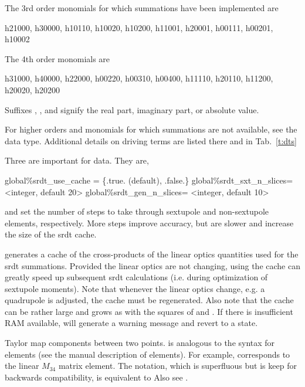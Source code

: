 \begin{description}
{{{{The 3rd order monomials for which summations have been implemented are
\begin{example}
  h21000, h30000, h10110, h10020, h10200,
  h11001, h20001, h00111, h00201, 
  h10002
\end{example}

The 4th order monomials are 
\begin{example}
  h31000, h40000, h22000,
  h00220, h00310, h00400, 
  h11110, h20110, h11200, h20020, h20200
\end{example}

Suffixes , , and  signify the real part, imaginary part, or absolute value.

For higher orders and monomials for which summations are not available, see the \Newline
{} data type.  Additional details on driving terms are listed there
and in Tab.~\ref{t:dts}

Three   are important for  data.  They are,
\begin{example}
  global{\%}srdt_use_cache = \{.true. (default), .false.\}
  global{\%}srdt_sxt_n_slices= <integer, default 20>
  global{\%}srdt_gen_n_slices= <integer, default 10>
\end{example}

 and  set the number of steps to take through sextupole
and non-sextupole elements, respectively.  More steps improve accuracy, but are slower and increase
the size of the srdt cache.

 generates a cache of the cross-products of the linear optics quantities used for
the srdt summations.  Provided the linear optics are not changing, using the cache can greatly speed
up subsequent srdt calculations (i.e. during optimization of sextupole moments).  Note that whenever
the linear optics change, e.g. a quadrupole is adjusted, the cache must be regenerated.  Also note
that the cache can be rather large and grows as with the squares of  and
.  If there is insufficient RAM available,  will generate a warning
message and revert to a  state.

  \item[t.$ijklm\ldots$,  tt.$ijklm\ldots$ \hspace{0.2in} $1 \le i,j,k,\ldots \le 6$] \Newline {}
Taylor map components between two points.  is analogous to the  syntax for
 elements (see the \bmad manual description of  elements). For example,
 corresponds to the linear $M_{34}$ matrix element. The  notation,
which is superfluous but is keep for backwards compatibility, is equivalent to 
Also see .

}}}}
\end{description}
